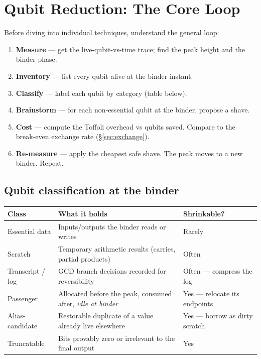 \documentclass[11pt,a4paper]{article}
\newcommand{\tof}{Toffoli\xspace}
\begin{document}
\section{Qubit Reduction: The Core Loop}
\label{sec:qubitloop}

Before diving into individual techniques, understand the general loop:

\begin{enumerate}
  \item \textbf{Measure} --- get the live-qubit-vs-time trace; find the peak height and the binder phase.
  \item \textbf{Inventory} --- list every qubit alive at the binder instant.
  \item \textbf{Classify} --- label each qubit by category (table below).
  \item \textbf{Brainstorm} --- for each non-essential qubit at the binder, propose a shave.
  \item \textbf{Cost} --- compute the \tof overhead vs qubits saved. Compare to the break-even exchange rate (\S\ref{sec:exchange}).
  \item \textbf{Re-measure} --- apply the cheapest safe shave. The peak moves to a new binder. Repeat.
\end{enumerate}

\subsection{Qubit classification at the binder}

\begin{center}
\begin{tabular}{p{3.2cm}p{5.5cm}p{3.5cm}}
\toprule
\textbf{Class} & \textbf{What it holds} & \textbf{Shrinkable?} \\
\midrule
Essential data & Inputs/outputs the binder reads or writes & Rarely \\
Scratch & Temporary arithmetic results (carries, partial products) & Often \\
Transcript / log & GCD branch decisions recorded for reversibility & Often --- compress the log \\
Passenger & Allocated before the peak, consumed after, \emph{idle at binder} & Yes --- relocate its endpoints \\
Alias-candidate & Restorable duplicate of a value already live elsewhere & Yes --- borrow as dirty scratch \\
Truncatable & Bits provably zero or irrelevant to the final output & Yes \\
\bottomrule
\end{tabular}
\end{center}
\end{document}
